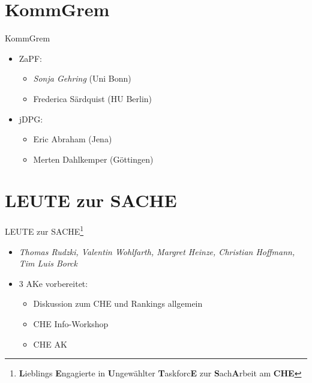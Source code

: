 \documentclass[compress, aspectratio=169]{beamer}
\begin{document}
\section{KommGrem}

\begin{frame}{KommGrem}
  \begin{itemize}
  \item[] ZaPF:
    \begin{itemize}
    \item \emph{Sonja Gehring} (Uni Bonn)
    \item Frederica Särdquist (HU Berlin)
    \end{itemize}
  \item[] jDPG:
    \begin{itemize}
    \item Eric Abraham (Jena)
    \item Merten Dahlkemper (Göttingen)
    \end{itemize}
  \end{itemize}
  \vspace{0.5cm}
\end{frame}

\section{LEUTE zur SACHE}

\begin{frame}{LEUTE zur SACHE\footnote{\textbf{L}ieblings \textbf{E}ngagierte in \textbf{U}ngewählter \textbf{T}askforc\textbf{E} zur \textbf{S}ach\textbf{A}rbeit am \textbf{CHE}}}
  \begin{itemize}
  \item \emph{Thomas Rudzki, Valentin Wohlfarth, Margret Heinze, Christian Hoffmann, Tim Luis Borck}
  \item 3 AKe vorbereitet: %
    \begin{itemize}
    \item Diskussion zum CHE und Rankings allgemein
    \item CHE Info-Workshop
    \item CHE AK
    \end{itemize}
  \end{itemize}
\end{frame}
\end{document}
